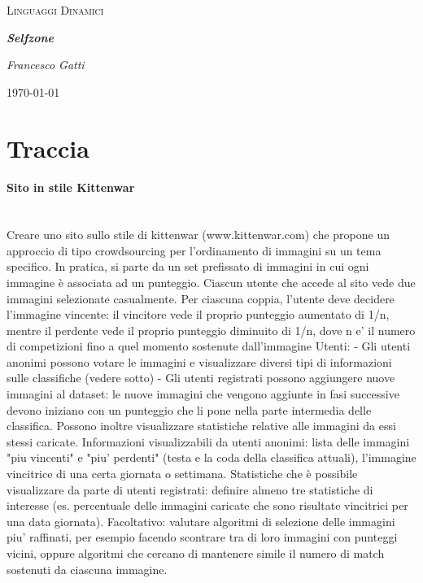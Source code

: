 \documentclass{article}
\newcommand{\proj}{\textit{Selfzone }}
\begin{document}
\begin{titlepage}
	\centering
	{\scshape\LARGE Linguaggi Dinamici\par}
	\vspace{1cm}
	{\huge\bfseries \proj\par}
	\vspace{2cm}
	{\Large\itshape Francesco Gatti\par}
	\vfill

	{\large \today\par}
\end{titlepage}

\renewcommand{\contentsname}{Indice}
\tableofcontents
\clearpage

\section{Traccia}
\paragraph{Sito in stile Kittenwar}\mbox{}\\
Creare uno sito sullo stile di kittenwar (www.kittenwar.com) che propone un approccio di tipo
crowdsourcing per l'ordinamento di immagini su un tema specifico.
In pratica, si parte da un set prefissato di immagini in cui ogni immagine è associata ad un
punteggio. Ciascun utente che accede al sito vede due immagini selezionate casualmente. Per
ciascuna coppia, l'utente deve decidere l'immagine vincente: il vincitore vede il proprio punteggio
aumentato di 1/n, mentre il perdente vede il proprio punteggio diminuito di 1/n, dove n e' il numero
di competizioni fino a quel momento sostenute dall'immagine
Utenti:
- Gli utenti anonimi possono votare le immagini e visualizzare diversi tipi di informazioni sulle
classifiche (vedere sotto)
- Gli utenti registrati possono aggiungere nuove immagini al dataset: le nuove immagini che
vengono aggiunte in fasi successive devono iniziano con un punteggio che li pone nella parte
intermedia delle classifica. Possono inoltre visualizzare statistiche relative alle immagini da essi
stessi caricate.
Informazioni visualizzabili da utenti anonimi: lista delle immagini "piu vincenti" e "piu' perdenti"
(testa e la coda della classifica attuali), l'immagine vincitrice di una certa giornata o settimana.
Statistiche che è possibile visualizzare da parte di utenti registrati: definire almeno tre statistiche di
interesse (es. percentuale delle immagini caricate che sono risultate vincitrici per una data giornata).
Facoltativo: valutare algoritmi di selezione delle immagini piu' raffinati, per esempio facendo
scontrare tra di loro immagini con punteggi vicini, oppure algoritmi che cercano di mantenere
simile il numero di match sostenuti da ciascuna immagine.
\clearpage
\end{document}
